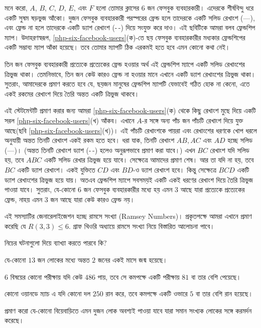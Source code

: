 \begin{solution}
	মনে করো, $A$, $B$, $C$, $D$, $E$, এবং $F$ হলো তোমার ক্লাসের $6$ জন ফেসবুক ব্যবহারকারী। এদেরকে শীর্ষবিন্দু ধরে একটি সুষম ষড়ভুজ আঁকো। দুজন ফেসবুক ব্যবহারকারী পরস্পরের ফ্রেন্ড হলে তাদেরকে একটি সলিড রেখাংশ (---), এবং ফ্রেন্ড না হলে তাদেরকে একটি ড্যাশ রেখাংশ (-\,-) দিয়ে সংযুক্ত করে দাও। এই ছবিটিকে আমরা বলব ফ্রেন্ডশিপ ম্যাপ। উদাহরণস্বরূপ, \autoref{php-six-facebook-users}(ক)-তে ছয় ফেসবুক ব্যবহারকারীর মধ্যকার ফ্রেন্ডশিপের একটি সম্ভাব্য ম্যাপ আঁকা হয়েছে। তবে তোমার ম্যাপটি ঠিক এরকমই হতে হবে এমন কোনো কথা নেই।

	তিন জন ফেসবুক ব্যবহারকারী প্রত্যেকে প্রত্যেকের ফ্রেন্ড হওয়ার অর্থ এই ফ্রেন্ডশিপ ম্যাপে একটি সলিড রেখাংশের ত্রিভুজ থাকা। তেমনিভাবে, তিন জন কেউ কারও ফ্রেন্ড না হওয়ার মানে এখানে একটি ড্যাশ রেখাংশের ত্রিভুজ থাকা। সুতরাং, আমাদেরকে প্রমাণ করতে হবে যে, ছয়জন মানুষের ফ্রেন্ডশিপ ম্যাপটি যেভাবেই গঠিত হোক না কেনো, এতে একই রকমের রেখাংশ দিয়ে তৈরি অন্তত একটি ত্রিভুজ থাকবে।

	এই স্টেটমেন্টটি প্রমাণ করার জন্য আমরা \autoref{php-six-facebook-users}(ক) থেকে কিছু রেখাংশ মুছে দিয়ে একটি সরল \autoref{php-six-facebook-users}(খ) আঁকব। এখানে $A$-র সঙ্গে অন্য পাঁচ জন পাঁচটি রেখাংশ দিয়ে যুক্ত আছে(ছবি \autoref{php-six-facebook-users}(খ))। এই পাঁচটি রেখাংশকে পায়রা এবং রেখাংশের ধরণকে খোপ ধরলে \phpname{} অনুযায়ী অন্তত তিনটি রেখাংশ একই রকম হতে হবে। ধরা যাক, তিনটি রেখাংশ $AB, AC$ এবং $AD$ হচ্ছে সলিড (---)। (অন্তত তিনটি রেখাংশ ড্যাশ (-\,-) হলেও অনুরূপভাবে প্রমাণ করা যাবে।) এখন $BC$ রেখাংশ যদি সলিড হয়, তবে $ABC$ একটি সলিড রেখার ত্রিভুজ হয়ে যাবে। সেক্ষেত্রে আমাদের প্রমাণ শেষ। আর তা যদি না হয়, তবে $BC$ একটি ড্যাশ রেখাংশ। একই যুক্তিতে $CD$ এবং $BD$-ও ড্যাশ রেখাংশ হবে। কিন্তু সেক্ষেত্রে $BCD$ একটি ড্যাশ রেখাংশের ত্রিভুজ হয়ে যায়। অতএব ফ্রেন্ডশিপ ম্যাপে সবসময়ই একটি একই ধরণের রেখাংশ দিয়ে তৈরি ত্রিভুজ পাওয়া যাবে। সুতরাং, যে-কোনো $6$ জন ফেসবুক ব্যবহারকারীর মধ্যে হয় এমন $3$ আছে যারা প্রত্যেকে প্রত্যেকের ফ্রেন্ড, নাহয় এমন $3$ জন আছে যারা কেউ কারও ফ্রেন্ড নয়।
\end{solution}
\begin{remark}
	এই সমস্যাটির জেনারেলাইজেশন হচ্ছে রামসে সংখ্যা (Ramsey Numbers)। প্রকৃতপক্ষে আমরা এখানে প্রমাণ করেছি যে $R(3,3)\leq 6$. গ্রাফ থিওরি অধ্যায়ে রামসে সংখ্যা নিয়ে বিস্তারিত আলোচনা পাবে।
\end{remark}

\begin{diybox}
	নিচের ঘটনাগুলো \phpname{} দিয়ে ব্যাখ্যা করতে পারবে কি?
	\begin{noindlist}
		\item যে-কোনো $13$ জন লোকের মধ্যে অন্তত $2$ জনের একই মাসে জন্ম হয়েছে।
		\item $6$ বিষয়ের কোনো পরীক্ষায় যদি কেউ $486$ পায়, তবে সে কমপক্ষে একটি পরীক্ষায় $81$ বা তার বেশি পেয়েছে।
		\item কোনো ওয়ানডে ম্যাচ এ যদি কোনো দল $250$ রান করে, তবে কমপক্ষে একটি ওভারে $5$ বা তার বেশি রান হয়েছে।
		\item প্রমাণ করো যে-কোনো বিয়েবাড়িতে এমন দুজন লোক অবশ্যই পাওয়া যাবে যারা সমান সংখ্যক লোকের সঙ্গে করমর্দন করেছে।
	\end{noindlist}
\end{diybox}

